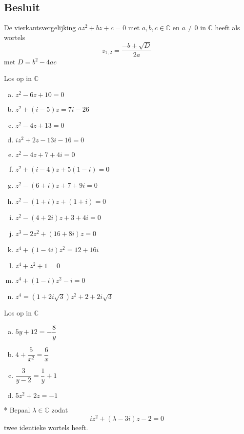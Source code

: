 \documentclass[12pt,twoside,a4paper]{article}
\begin{document}
\subsection{Besluit}

\begin{mdframed}
De vierkantsvergelijking $az^2+bz+c=0$ met $a,b,c\in\mathbb{C}$ en $a\neq 0$ in $\mathbb{C}$ heeft als wortels
$$ z_{1,2}=\dfrac{-b\pm\sqrt{D}}{2a}$$
met $D=b^2-4ac$
\end{mdframed}

\begin{oefening}
  Los op in $\mathbb{C}$
  \begin{multicols}{2}
    \begin{enumerate}[(a)]
      \itemsep 1em
    \item $z^2-6z+10=0$
    \item $z^2+(i-5)z=7i-26$
    \item $z^2-4z+13=0$
    \item $iz^2+2z-13i-16=0$
    \item $z^2-4z+7+4i=0$
    \item $z^2+(i-4)z+5(1-i)=0$
    \item $z^2-(6+i)z+7+9i=0$
    \item $z^2-(1+i)z+(1+i)=0$
    \item $z^2-(4+2i)z+3+4i=0$
    \item $z^3-2z^2+(16+8i)z=0$
    \item $z^4+(1-4i)z^2=12+16i$
    \item $z^4+z^2+1=0$
    \item $z^4+(1-i)z^2-i=0$
    \item $z^4=(1+2i\sqrt{3})z^2+2+2i\sqrt{3}$
    \end{enumerate}
  \end{multicols}
\end{oefening}

\begin{oefening}
Los op in $\mathbb{C}$
  \begin{enumerate}[(a)]
    \itemsep 1em
  \item $5y+12=-\dfrac{8}{y}$
  \item $4+\dfrac{5}{x^2}=\dfrac{6}{x}$
  \item $\dfrac{3}{y-2}=\dfrac{1}{y}+1$
  \item $5z^2+2z=-1$
  \end{enumerate}
\end{oefening}

\pagebreak
\begin{oefening}*
  Bepaal $\lambda\in\mathbb{C}$ zodat
  \[iz^2+(\lambda-3i)z-2=0\]
  twee identieke wortels heeft.
\end{oefening}
\end{document}
